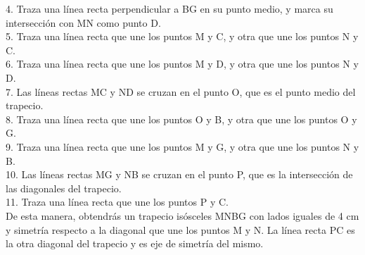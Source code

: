 \documentclass{article}
\begin{document}
4. Traza una línea recta perpendicular a BG en su punto medio, y marca su intersección con MN como punto D.\\
5. Traza una línea recta que une los puntos M y C, y otra que une los puntos N y C.\\
6. Traza una línea recta que une los puntos M y D, y otra que une los puntos N y D.\\
7. Las líneas rectas MC y ND se cruzan en el punto O, que es el punto medio del trapecio.\\
8. Traza una línea recta que une los puntos O y B, y otra que une los puntos O y G.\\
9. Traza una línea recta que une los puntos M y G, y otra que une los puntos N y B.\\
10. Las líneas rectas MG y NB se cruzan en el punto P, que es la intersección de las diagonales del trapecio.\\
11. Traza una línea recta que une los puntos P y C.\\
De esta manera, obtendrás un trapecio isósceles MNBG con lados iguales de 4 cm y simetría respecto a la diagonal que une los puntos M y N. La línea recta PC es la otra diagonal del trapecio y es eje de simetría del mismo.\\
\\
\end{document}
